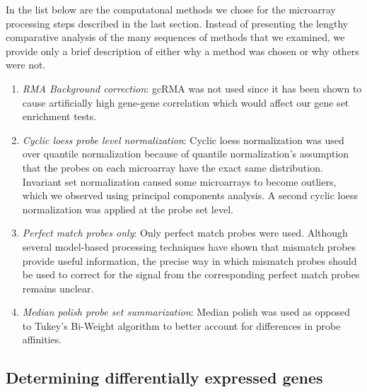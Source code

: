 In the list below are the computatonal methods we chose for the microarray
processing steps described in the last section. 
Instead of presenting the lengthy comparative analysis of the many
sequences of methods that we examined, we provide only a brief description of either 
why a method was chosen or why others were not.

\begin{enumerate}
  \item \emph{RMA Background correction}\autocite{Irizarry2003}: 
  gcRMA\autocite{Wu2004} was not used since it
  has been shown to cause artificially high gene-gene correlation which
  would affect our gene set enrichment tests.\autocite{Lim2007}
  
  \item \emph{Cyclic loess probe level normalization}: Cyclic loess normalization was 
  used over quantile normalization because of quantile normalization's assumption
  that the probes on each microarray have the exact same 
  distribution.\autocite{Ballman2004} Invariant
  set normalization\autocite{LiWong2001b} caused some microarrays to become outliers, which we observed
  using principal components analysis. A second cyclic loess normalization was applied
  at the probe set level.
  
  \item \emph{Perfect match probes only}: Only perfect match probes were used.
  Although several model-based processing techniques have shown that mismatch
  probes provide useful information, the precise way in which mismatch probes should
  be used to correct for the signal from the corresponding perfect match 
  probes remains unclear.\autocite{Wang2007}
  
  \item \emph{Median polish probe set summarization}: Median polish was 
  used as opposed to Tukey's Bi-Weight algorithm to better account for 
  differences in probe affinities.\autocite{Tukey1977,AffymetrixWhitePaper}
    
\end{enumerate}

\subsection{Determining differentially expressed genes}\label{S:DE}

